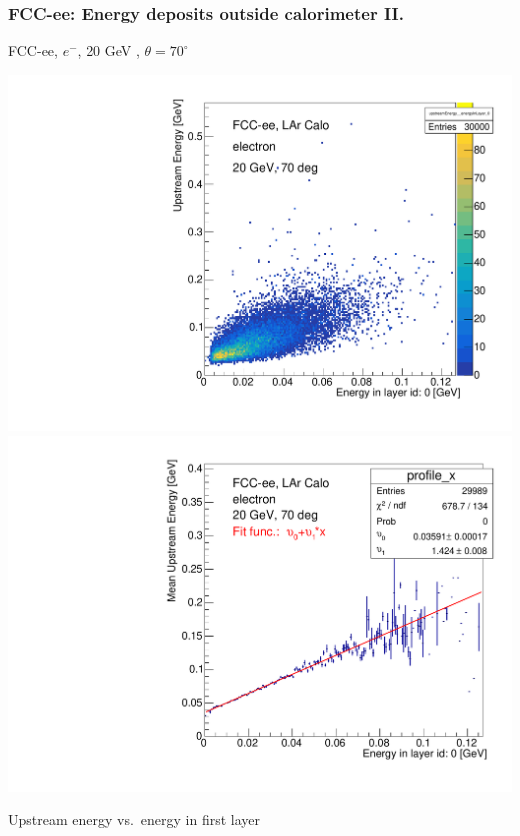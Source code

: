 \documentclass[aspectratio=169]{beamer}
\newcommand{\bluetext}[1]{%
  \textcolor{myBlue}{#1}
}
\newcommand{\redtext}[1]{%
  \textcolor{myRed}{#1}
}
\begin{document}
\begin{frame}
  \frametitle{FCC-ee: Energy deposits outside calorimeter II.}

  \centering
  FCC-ee, $e^{-}$, \redtext{20 GeV}, \bluetext{$\theta = 70^{\circ}$} \\[1.2ex]
  \begin{adjustwidth}{-5mm}{-5mm}
    \includegraphics[width=0.49\linewidth]{figures/2d/hist_upstream_vs_layer_0_70deg_20GeV.pdf}
    \includegraphics[width=0.49\linewidth]{figures/2d/profile_upstream_vs_layer_0_70deg_20GeV.pdf}
  \end{adjustwidth}
  \redtext{Upstream} energy vs.\ energy in first layer
\end{frame}
\end{document}
